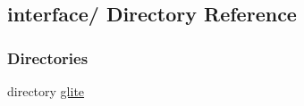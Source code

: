 \hypertarget{dir_000000}{
\subsection{interface/ Directory Reference}
\label{dir_000000}
}
\subsubsection*{Directories}
\begin{CompactItemize}
\item 
directory \hyperlink{dir_000001}{glite}
\end{CompactItemize}
